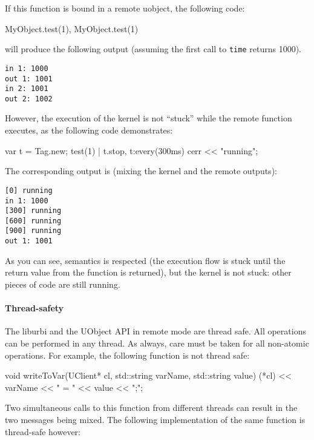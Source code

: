 If this function is bound in a remote uobject, the following code:

\begin{cxx}
MyObject.test(1), MyObject.test(1)
\end{cxx}

\noindent
will produce the following output (assuming the first call to
\lstinline|time| returns 1000).

\begin{lstlisting}
in 1: 1000
out 1: 1001
in 2: 1001
out 2: 1002
\end{lstlisting}

However, the execution of the \urbi kernel is not ``stuck'' while the
remote function executes, as the following code demonstrates:

\begin{urbiunchecked}
var t = Tag.new;
test(1) | t.stop,
t:every(300ms)
  cerr << "running";
\end{urbiunchecked}

The corresponding output is (mixing the kernel and the remote outputs):

\begin{lstlisting}
[0] running
in 1: 1000
[300] running
[600] running
[900] running
out 1: 1001
\end{lstlisting}

As you can see, \urbi semantics is respected (the execution flow is
stuck until the return value from the function is returned), but the
kernel is not stuck: other pieces of code are still running.

\paragraph{Thread-safety}

The liburbi and the UObject API in remote mode are thread safe. All
operations can be performed in any thread. As always, care must be
taken for all non-atomic operations. For example, the following
function is not thread safe:

\begin{cxx}
void
writeToVar(UClient* cl, std::string varName, std::string value)
{
  (*cl) << varName << " = " << value << ";";
}
\end{cxx}

Two simultaneous calls to this function from different threads can
result in the two messages being mixed.  The following implementation
of the same function is thread-safe however:

